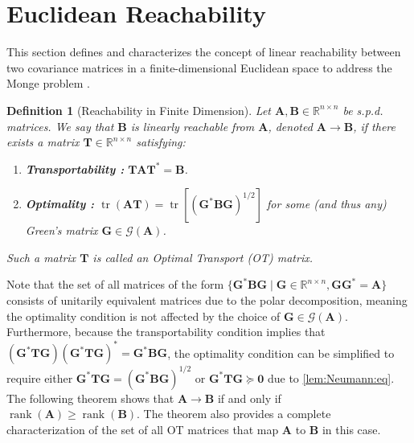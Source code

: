\documentclass[noinfoline]{imsart}\setcounter{tocdepth}{2}
\renewcommand{\b}[1]{\mathbb{#1}} %
\newcommand{\m}[1]{\mathbf{#1}} %
\renewcommand{\c}[1]{\mathcal{#1}} %
\DeclareMathOperator*{\tr}{tr}
\DeclareMathOperator*{\rk}{rank}
\theoremstyle{plain}
\newtheorem{definition}{Definition}[section]
\begin{document}
\section{Euclidean Reachability}\label{sec:fin:dim}
This section defines and characterizes the concept of linear reachability between two covariance matrices in a finite-dimensional Euclidean space to address the Monge problem \cite{villani2008optimal, panaretos2020invitation, ambrosio2008gradient}.


\begin{definition}[Reachability in Finite Dimension]\label{def:reachable}
Let $\m{A}, \m{B} \in \b{R}^{n \times n}$ be s.p.d. matrices. We say that $\m{B}$ is linearly reachable from $\m{A}$, denoted $\m{A} \to \m{B}$, if there exists a matrix $\m{T} \in \b{R}^{n \times n}$ satisfying:
\begin{enumerate}
    \item [] \textbf{Transportability :} $\m{T} \m{A} \m{T}^{*} = \m{B}$.
    \item [] \textbf{Optimality :} $\tr (\m{A} \m{T}) = \tr [(\m{G}^{*} \m{B} \m{G})^{1/2}]$ for some (and thus any) Green's matrix $\m{G} \in \c{G}(\m{A})$. 
\end{enumerate}
Such a matrix $\m{T}$ is called an Optimal Transport (OT) matrix.
\end{definition}

Note that the set of all matrices of the form $\{\m{G}^{*} \m{B} \m{G} \mid \m{G} \in \b{R}^{n \times n}, \m{G} \m{G}^{*} = \m{A} \}$ consists of unitarily equivalent matrices due to the polar decomposition, meaning the optimality condition is not affected by the choice of $\m{G} \in \c{G}(\m{A})$. Furthermore, because the transportability condition implies that $(\m{G}^{*} \m{T} \m{G})(\m{G}^{*} \m{T} \m{G})^{*} = \m{G}^{*} \m{B} \m{G}$,
the optimality condition can be simplified to require either $\m{G}^{*} \m{T} \m{G} = (\m{G}^{*} \m{B} \m{G})^{1/2}$ or $\m{G}^{*} \m{T} \m{G} \succeq \m{0}$ due to \cref{lem:Neumann:eq}.
The following theorem shows that $\m{A} \to \m{B}$ if and only if $\rk(\m{A}) \geq \rk(\m{B})$. The theorem also provides a complete characterization of the set of all OT matrices that map $\m{A}$ to $\m{B}$ in this case.
\end{document}
